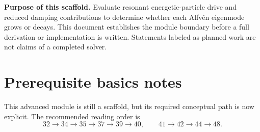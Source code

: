 \documentclass[11pt]{article}
\begin{document}

\begin{overviewbox}
\textbf{Purpose of this scaffold.} Evaluate resonant energetic-particle drive and reduced damping contributions to determine whether each Alfvén eigenmode grows or decays. This document establishes the module boundary before a full derivation or implementation is written. Statements labeled as planned work are not claims of a completed solver.
\end{overviewbox}

\ProjectTOC

\section{Prerequisite basics notes}
This advanced module is still a scaffold, but its required conceptual path is now explicit. The recommended reading order is
\begin{equation}
32\rightarrow34\rightarrow35\rightarrow37\rightarrow39\rightarrow40,
\qquad
41\rightarrow42\rightarrow44\rightarrow48.
\end{equation}
\end{document}
